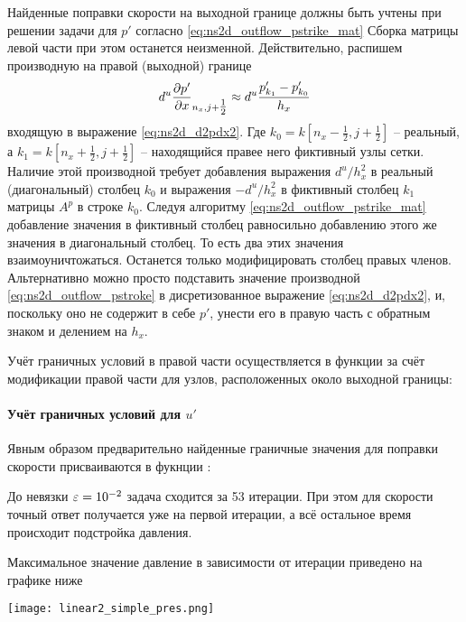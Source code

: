 Найденные поправки скорости на выходной границе
должны быть учтены при решении задачи для $p'$ согласно
\cref{eq:ns2d_outflow_pstrike_mat}
Сборка матрицы левой части при этом останется неизменной.
Действительно, распишем производную на правой (выходной) границе
$$
d^u\frac{\partial p'}{\partial x}_{n_x, j+\tfrac12} \approx d^u\frac{p'_{k_1} - p'_{k_0}}{h_x}
$$
входящую в выражение \cref{eq:ns2d_d2pdx2}.
Где $k_0 = k[n_x - \tfrac12, j+\tfrac12]$ -- реальный,
а $k_1 = k[n_x + \tfrac12, j+\tfrac12]$ -- находящийся правее него фиктивный узлы сетки.
Наличие этой производной требует добавления
выражения $d^u/h_x^2$ в реальный (диагональный) столбец $k_0$
и выражения $-d^u/h_x^2$ в фиктивный столбец $k_1$ матрицы $A^p$ в строке $k_0$.
Следуя алгоритму \cref{eq:ns2d_outflow_pstrike_mat} добавление
значения в фиктивный столбец равносильно добавлению этого же значения в диагональный столбец.
То есть два этих значения взаимоуничтожаться. Останется только модифицировать столбец правых членов.
Альтернативно можно просто подставить значение производной 
\cref{eq:ns2d_outflow_pstroke} в дисретизованное выражение 
\cref{eq:ns2d_d2pdx2}, и, поскольку оно не содержит в себе $p'$, унести его в правую часть
с обратным знаком и делением на $h_x$.

Учёт граничных условий в правой части осуществляется в функции
 за счёт модификации правой части для узлов,
расположенных около выходной границы:

\paragraph{Учёт граничных условий для $u'$}
Явным образом предварительно найденные
граничные значения для поправки скорости присваиваются в фукнции
:

До невязки $\varepsilon=10^{-2}$ задача сходится за 53 итерации.
При этом для скорости точный ответ получается уже на первой итерации,
а всё остальное время происходит подстройка давления.

Максимальное значение давление в зависимости от итерации приведено на графике ниже
\begin{center}
\texttt{[image: linear2\_simple\_pres.png]}
\end{center}


